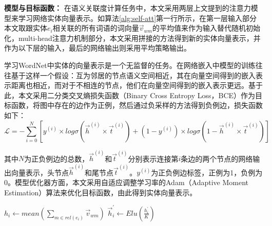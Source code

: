 \textbf{模型与目标函数：}
在语义关联度计算任务中，本文采用两层上文提到的注意力模型来学习网络实体向量表示。如算法\ref{alg:self-att}第一行所示，在第一层输入部分本文取跟实体$e_i$相关联的所有词语的词向量$\vec v_{wm}$的平均值来作为输入替代随机初始化，multi-head注意力机制部分，本文采用拼接的方法得到新的实体向量表示，并作为以下层的输入，最后的网络输出则采用平均策略输出。

学习WordNet中实体的向量表示是一个无监督的任务。在网络嵌入中模型的训练往往基于这样一个假设：互为邻居的节点语义空间相近，其在向量空间得到的嵌入表示距离也相近，而对于不相连的节点，他们在向量空间得到的嵌入表示更远。基于此，本文采用二分类交叉熵损失函数（Binary Cross Entropy Loss，BCE）作为目标函数，将图中存在的边作为正例，然后通过负采样的方法得到负例边，损失函数如下：
\begin{equation}
    \mathcal{L} = -\sum_{i = 0}^{N} [y^{(i)} \times log\sigma(\vec h^{(i)} \times \vec t^{(i)})+(1 - y_{}^{(i)})\times log\sigma⁡(1 - \vec h^{(i)} \times \vec t^{(i)})]
    \label{wordnet_loss}
\end{equation}

\noindent 其中$N$为正负例边的总数，$\vec h^{(i)}$和$\vec t^{(i)}$分别表示连接第$i$条边的两个节点的网络输出向量表示，头节点$\vec h^{(i)}$和尾节点$\vec t^{(i)}$。$y^{(i)}$为正负例边标签，正例为1，负例为0。模型优化器方面，本文采用自适应调整学习率的Adam（Adaptive Moment Estimation）算法来优化目标函数，由此得到实体向量表示。

\begin{algorithm}
    \label{alg:self-att}
    $h_i \leftarrow mean(\sum_{m \in rel(e_i)} \vec v_{wm})$ \;
    $\vec h_i^{'} \leftarrow Elu(\frac{h_i^{'}}{K})$
\end{algorithm}

